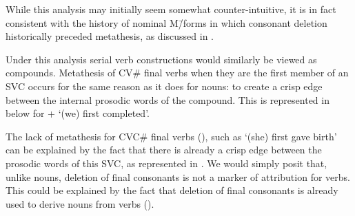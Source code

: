 While this analysis may initially seem somewhat counter-intuitive,
it is in fact consistent with the history
of nominal M\=/forms in which consonant deletion
historically preceded metathesis, as discussed in .

Under this analysis serial verb constructions would similarly be viewed as compounds.
Metathesis of CV{\#} final verbs when they are the first
member of an SVC occurs for the same reason as it does for nouns:
to create a crisp edge between the internal prosodic words of the compound.
This is represented in  below for
 +  {\ra}  `(we) first completed'.

The lack of metathesis for CVC{\#} final verbs (),
such as  `(she) first gave birth' can be explained
by the fact that there is already a crisp edge between the prosodic
words of this SVC, as represented in .
We would simply posit that, unlike nouns, deletion of final
consonants is not a marker of attribution for verbs.
This could be explained by the fact that deletion of final consonants
is already used to derive nouns from verbs ().

